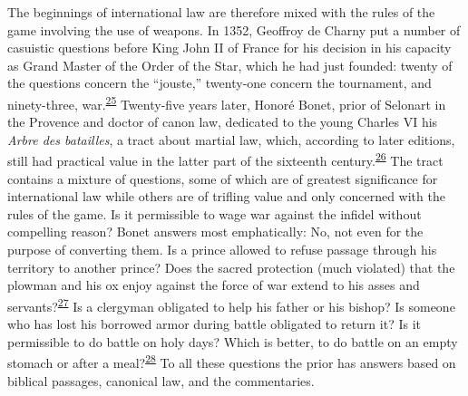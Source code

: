 The beginnings of international law are therefore mixed with the rules
of the game involving the use of weapons. In 1352, Geoffroy de Charny
put a number of casuistic questions before King John II of France for
his decision in his capacity as Grand Master of the Order of the Star,
which he had just founded: twenty of the questions concern the
``jouste,'' twenty-one concern the tournament, and ninety-three,
war.\textsuperscript{\protect\hypertarget{18_Chapter_Eleven__THE_FORMS_OF_THO.xhtmlux5cux23id_582}{\protect\hyperlink{23_NOTES.xhtmlux5cux23id_583}{25}}}
Twenty-five years later, Honoré Bonet, prior of Selonart in the Provence
and doctor of canon law, dedicated to the young Charles VI his
\emph{Arbre des batailles}, a tract about martial law, which, according
to later editions, still had practical value in the latter part of the
sixteenth
century.\textsuperscript{\protect\hypertarget{18_Chapter_Eleven__THE_FORMS_OF_THO.xhtmlux5cux23id_580}{\protect\hyperlink{23_NOTES.xhtmlux5cux23id_581}{26}}}
The tract contains a mixture of questions, some of which are of greatest
significance for international law while others are of trifling value
and only concerned with the rules of the game. Is it permissible to wage
war against the infidel without compelling reason? Bonet answers most
emphatically: No, not even for the purpose of converting them. Is a
prince allowed to refuse passage through his territory to another
prince? Does the sacred protection (much violated) that the plowman and
his ox enjoy against the force of war extend to his asses and
servants?\textsuperscript{\protect\hypertarget{18_Chapter_Eleven__THE_FORMS_OF_THO.xhtmlux5cux23id_579}{\protect\hyperlink{23_NOTES.xhtmlux5cux23page_430}{27}}}
Is a clergyman obligated to help his father or his bishop? Is someone
who has lost his borrowed armor during battle obligated to return it? Is
it permissible to do battle on holy days? Which is better, to do battle
on an empty stomach or after a
meal?\textsuperscript{\protect\hypertarget{18_Chapter_Eleven__THE_FORMS_OF_THO.xhtmlux5cux23id_577}{\protect\hyperlink{23_NOTES.xhtmlux5cux23id_578}{28}}}
To all these questions the prior has answers based on biblical passages,
canonical law, and the commentaries.

